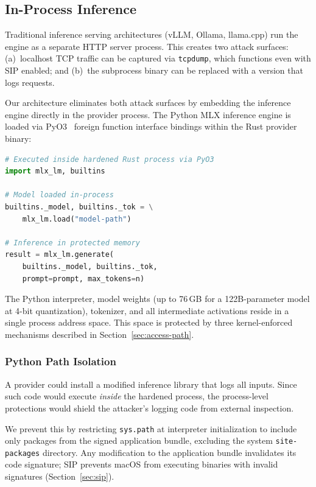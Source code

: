 \documentclass[10pt,twocolumn,letterpaper]{article}
\begin{document}
\subsection{In-Process Inference}
\label{sec:inprocess}

Traditional inference serving architectures (vLLM, Ollama, llama.cpp) run the engine as a separate HTTP server process. This creates two attack surfaces: (a)~localhost TCP traffic can be captured via \texttt{tcpdump}, which functions even with SIP enabled; and (b)~the subprocess binary can be replaced with a version that logs requests.

Our architecture eliminates both attack surfaces by embedding the inference engine directly in the provider process. The Python MLX inference engine is loaded via PyO3~\cite{pyo3} foreign function interface bindings within the Rust provider binary:

\begin{lstlisting}[language=Python,caption={Inference executes inside the hardened process address space. No subprocess, HTTP server, socket, or pipe is created.}]
# Executed inside hardened Rust process via PyO3
import mlx_lm, builtins

# Model loaded in-process
builtins._model, builtins._tok = \
    mlx_lm.load("model-path")

# Inference in protected memory
result = mlx_lm.generate(
    builtins._model, builtins._tok,
    prompt=prompt, max_tokens=n)
\end{lstlisting}

The Python interpreter, model weights (up to 76\,GB for a 122B-parameter model at 4-bit quantization), tokenizer, and all intermediate activations reside in a single process address space. This space is protected by three kernel-enforced mechanisms described in Section~\ref{sec:access-path}.

\subsubsection{Python Path Isolation}

A provider could install a modified inference library that logs all inputs. Since such code would execute \emph{inside} the hardened process, the process-level protections would shield the attacker's logging code from external inspection.

We prevent this by restricting \texttt{sys.path} at interpreter initialization to include only packages from the signed application bundle, excluding the system \texttt{site-packages} directory. Any modification to the application bundle invalidates its code signature; SIP prevents macOS from executing binaries with invalid signatures (Section~\ref{sec:sip}).
\end{document}
